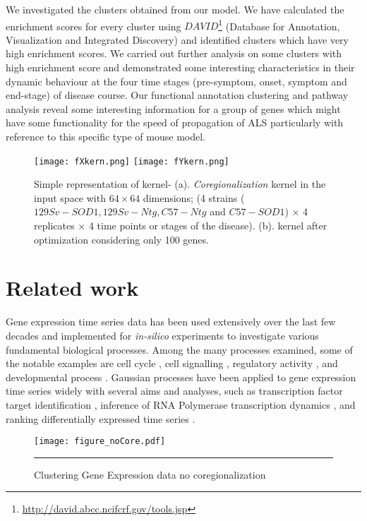 We investigated the clusters obtained from our model. We have calculated the enrichment scores \cite{Huang:2009Enrichment} for every cluster using $DAVID$\footnote{\url{http://david.abcc.ncifcrf.gov/tools.jsp}} (Database for Annotation, Visualization and Integrated Discovery) \cite{Huang:2009David} and identified clusters which have very high enrichment scores.  We carried out further analysis on some clusters with high enrichment score and demonstrated some interesting characteristics in their dynamic behaviour at the four time stages (pre-symptom, onset, symptom and end-stage) of disease course. Our functional annotation clustering and pathway analysis reveal some interesting information for a group of genes which might have some functionality for the speed of propagation of ALS particularly with reference to this specific type of mouse model. 
\begin{figure}
 \begin{center}
  \texttt{[image: fXkern.png]}
  \texttt{[image: fYkern.png]}
  \caption {Simple representation of kernel- (a). \emph{Coregionalization} kernel in the input space  with $64\times64$ dimensions; (4 strains ($129Sv-SOD1, 129Sv-Ntg, C57-Ntg$ and $C57-SOD1$) $\times$ 4 replicates $\times$ 4 time points or stages of the disease). (b). kernel after optimization considering only 100 genes.\label{fig:kernel}}
 \end{center}
\end{figure}

\section{Related work}
Gene expression time series data has been used extensively over the last few decades and implemented for \textit {in-silico} experiments to investigate various fundamental biological processes. Among the many processes examined, some of the notable examples are cell cycle \cite{Spellman:1998}, cell signalling \cite{Barenco:2006}, regulatory activity \cite{Sanguinetti:2006}, and developmental process \cite{Tomancak:2002}. Gaussian processes have been applied to gene expression time series widely with several aims and analyses, such as transcription factor target identification \cite{Honkela:2010}, inference of RNA Polymerase transcription dynamics \cite{Maina:2014}, and ranking differentially expressed time series \cite{Kalaitzis:2011}.

\begin{figure}
	\centering
		\texttt{[image: figure\_noCore.pdf]}
		\rule{35em}{0.5pt}
	\caption[Clustering Gene Expression data no coregionalization]
		{Clustering Gene Expression data no coregionalization}
	\label{fig:clsNoCoregionalization}
\end{figure}

